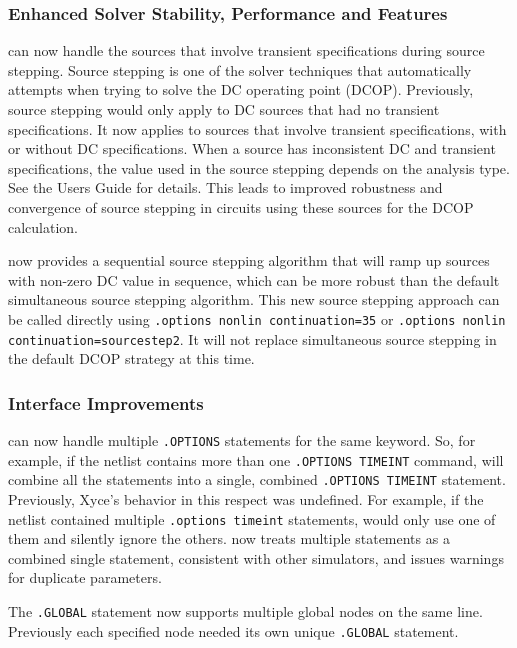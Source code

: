 \documentclass[letterpaper]{scrartcl}
\begin{document}
\subsubsection*{Enhanced Solver Stability, Performance and Features}
\begin{XyceItemize}
\item  \Xyce{} can now handle the sources that involve transient specifications
     during source stepping. Source stepping is one of the solver techniques
     that \Xyce{} automatically attempts when trying to solve the DC operating
     point (DCOP). Previously, source stepping would only apply to DC sources
     that had no transient specifications. It now applies to sources that
     involve transient specifications, with or without DC specifications. When
     a source has inconsistent DC and transient specifications, the value used
     in the source stepping depends on the analysis type. See the \Xyce{} Users
     Guide for details. This leads to improved robustness and convergence of
     source stepping in circuits using these sources for the DCOP calculation.

\item \Xyce{} now provides a sequential source stepping algorithm that will
     ramp up sources with non-zero DC value in sequence, which can be more
     robust than the default simultaneous source stepping algorithm.  This new
     source stepping approach can be called directly using \texttt{.options
     nonlin continuation=35} or \texttt{.options nonlin
     continuation=sourcestep2}.  It will not replace simultaneous source
     stepping in the default DCOP strategy at this time.

\end{XyceItemize}

\subsubsection*{Interface Improvements}
\begin{XyceItemize}
\item \Xyce{} can now handle multiple \texttt{.OPTIONS} statements for the same
     keyword.   So, for example, if the netlist contains more than one
     \texttt{.OPTIONS TIMEINT} command, \Xyce{} will combine all the statements
     into a single, combined \texttt{.OPTIONS TIMEINT} statement.  Previously,
     Xyce's behavior in this respect was undefined.  For example, if the
     netlist contained multiple \texttt{.options timeint} statements, \Xyce{}
     would only use one of them and silently ignore the others.  \Xyce{} now
     treats multiple statements as a combined single statement, consistent with
     other simulators, and issues warnings for duplicate parameters.

\item The \texttt{.GLOBAL} statement now supports multiple global nodes on the
     same line.  Previously each specified node needed its own unique
     \texttt{.GLOBAL} statement.

\end{XyceItemize}
\end{document}

